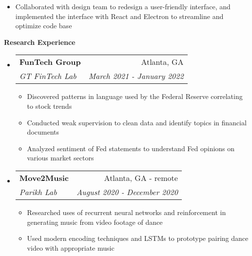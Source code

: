 \documentclass[letterpaper,10pt]{article}
\makeatletter
\newcommand{\resitem}[1]{\item #1 \vspace{-3.5pt}}
\newcommand{\resheading}[1]{{\large \colorbox{mygrey}{\begin{minipage}{\textwidth}{\textbf{#1 \vphantom{p\^{E}}}}\end{minipage}}}}
\newcommand{\ressubheading}[4]{
\begin{tabular*}{7.0in}{l@{\extracolsep{\fill}}r}
		\textbf{#1} & #2 \\
		\textit{#3} & \textit{#4} \\
\end{tabular*}\vspace{-6pt}}
\makeatother
\begin{document}
\begin{itemize}
\begin{itemize}
        \resitem{Collaborated with design team to redesign a user-friendly interface, and implemented the interface with React and Electron to streamline and optimize code base}
    \end{itemize}
\end{itemize}


\resheading{Research Experience}
\begin{itemize}
\item
    \ressubheading{FunTech Group}{Atlanta, GA}{GT FinTech Lab}{March 2021 - January 2022}
    \begin{itemize}
        \resitem{Discovered patterns in language used by the Federal Reserve correlating to stock trends}
        \resitem{Conducted weak supervision to clean data and identify topics in financial documents}
        \resitem{Analyzed sentiment of Fed statements to understand Fed opinions on various market sectors}
    \end{itemize}
\item
    \ressubheading{Move2Music}{Atlanta, GA - remote}{Parikh Lab}{August 2020 - December 2020}
    \begin{itemize}
        \resitem{Researched uses of recurrent neural networks and reinforcement in generating music from video footage of dance}
        \resitem{Used modern encoding techniques and LSTMs to prototype pairing dance video with appropriate music}
    \end{itemize}
\end{itemize}

\end{document}
